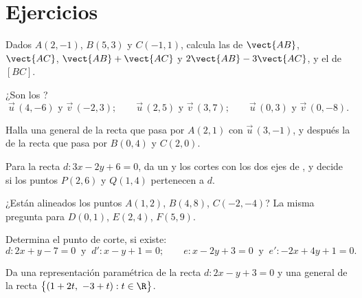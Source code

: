 \section{Ejercicios}

\begin{exercise}[$\star$]\label{exo:g11:vect:1}
Dados $A(2, -1)$, $B(5, 3)$ y $C(-1, 1)$, calcula las  de
$\vect{AB}$, $\vect{AC}$, $\vect{AB} + \vect{AC}$ y
$2\vect{AB} - 3\vect{AC}$, y el  de $[BC]$.
\end{exercise}

\begin{exercise}[$\star$]\label{exo:g11:vect:2}
¿Son  los ?
\[
\vec u\,(4, -6) \text{ y } \vec v\,(-2, 3); \qquad
\vec u\,(2, 5) \text{ y } \vec v\,(3, 7); \qquad
\vec u\,(0, 3) \text{ y } \vec v\,(0, -8).
\]
\end{exercise}

\begin{exercise}[$\star$]\label{exo:g11:vect:3}
Halla una  general de la recta que pasa por $A(2, 1)$ con  $\vec u\,(3, -1)$, y después la de la recta que pasa por
$B(0, 4)$ y $C(2, 0)$.
\end{exercise}

\begin{exercise}[$\star$]\label{exo:g11:vect:4}
Para la recta $d: 3x - 2y + 6 = 0$, da un  y los cortes con
los dos ejes de , y decide si los puntos $P(2, 6)$ y $Q(1, 4)$
pertenecen a $d$.
\end{exercise}

\begin{exercise}[$\star\star$]\label{exo:g11:vect:5}
¿Están alineados los puntos $A(1, 2)$, $B(4, 8)$, $C(-2, -4)$? La misma
pregunta para $D(0, 1)$, $E(2, 4)$, $F(5, 9)$.
\end{exercise}

\begin{exercise}[$\star\star$]\label{exo:g11:vect:6}
Determina el punto de corte, si existe:
\[
d: 2x + y - 7 = 0 \ \text{ y }\ d': x - y + 1 = 0;
\qquad
e: x - 2y + 3 = 0 \ \text{ y }\ e': -2x + 4y + 1 = 0 .
\]
\end{exercise}

\begin{exercise}[$\star\star$]\label{exo:g11:vect:7}
Da una representación paramétrica de la recta $d: 2x - y + 3 = 0$ y una
 general de la recta
$\bigl\{(1 + 2t,\ -3 + t) : t \in \R\bigr\}$.
\end{exercise}

